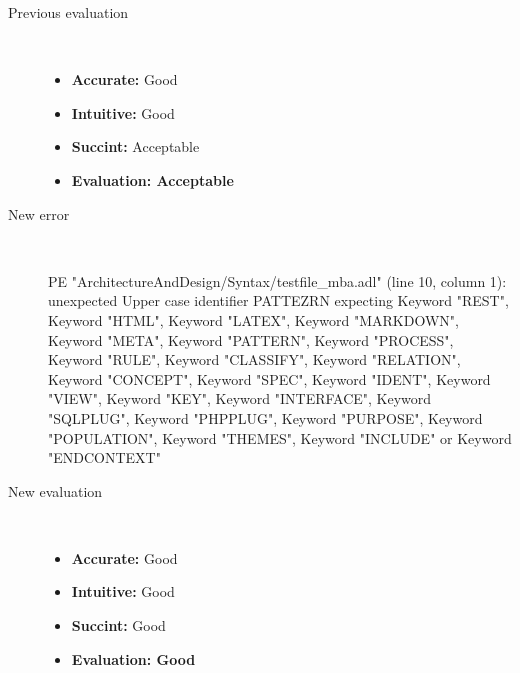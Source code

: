 \begin{description}
\begin{haskell}
\end{haskell}
  \item[Previous evaluation]~\\
    \begin{itemize}
    \item \textbf{Accurate:} Good
    \item \textbf{Intuitive:} Good
    \item \textbf{Succint:} Acceptable
    \item \textbf{Evaluation: Acceptable}
    \end{itemize}
  \item[New error]~\\
\begin{haskell}
PE "ArchitectureAndDesign/Syntax/testfile_mba.adl" (line 10, column 1):
unexpected Upper case identifier PATTEZRN
expecting Keyword "REST", Keyword "HTML", Keyword "LATEX", Keyword "MARKDOWN", Keyword "META", Keyword "PATTERN", Keyword "PROCESS", Keyword "RULE", Keyword "CLASSIFY", Keyword "RELATION", Keyword "CONCEPT", Keyword "SPEC", Keyword "IDENT", Keyword "VIEW", Keyword "KEY", Keyword "INTERFACE", Keyword "SQLPLUG", Keyword "PHPPLUG", Keyword "PURPOSE", Keyword "POPULATION", Keyword "THEMES", Keyword "INCLUDE" or Keyword "ENDCONTEXT"
\end{haskell}
  \item[New evaluation]~\\
    \begin{itemize}
    \item \textbf{Accurate:} Good
    \item \textbf{Intuitive:} Good
    \item \textbf{Succint:} Good
    \item \textbf{Evaluation: Good
}
    \end{itemize}
  \end{description}

\hrulefill

